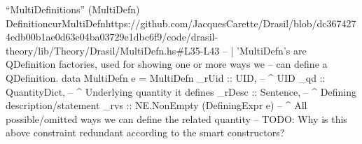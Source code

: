 \begin{haskell}{``MultiDefinitions'' (MultiDefn) Definition}{curMultiDefn}{https://github.com/JacquesCarette/Drasil/blob/dc3674274edb00b1ae0d63e04ba03729e1dbc6f9/code/drasil-theory/lib/Theory/Drasil/MultiDefn.hs\#L35-L43}
-- | 'MultiDefn's are QDefinition factories, used for showing one or more ways we
--   can define a QDefinition.
data MultiDefn e = MultiDefn {
    _rUid  :: UID,                         -- ^ UID
    _qd    :: QuantityDict,                -- ^ Underlying quantity it defines
    _rDesc :: Sentence,                    -- ^ Defining description/statement
    _rvs   :: NE.NonEmpty (DefiningExpr e) -- ^ All possible/omitted ways we can define the related quantity
           -- TODO: Why is this above constraint redundant according to the smart constructors?
}
\end{haskell}


